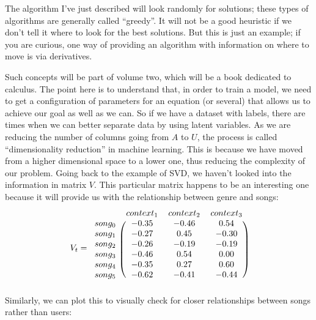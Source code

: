 \documentclass[600paper, 11pt,twoside,openany]{kdp}
\begin{document}
\par 
\vspace{-3pt}
\indent The algorithm I’ve just described will look randomly for solutions; these types of algorithms are generally called “greedy”. It will not be a good heuristic if we don’t tell it where to look for the best solutions. But this is just an example; if you are curious, one way of providing an algorithm with information on where to move is via derivatives. 
\par 
\vspace{-3pt}
\indent Such concepts will be part of volume two, which will be a book dedicated to calculus. The point here is to understand that, in order to train a model, we need to get a configuration of parameters for an equation (or several) that allows us to achieve our goal as well as we can. So if we have a dataset with labels, there are times when we can better separate data by using latent variables. As we are reducing the number of columns going from $A$ to $U$, the process is called “dimensionality reduction” in machine learning. This is because we have moved from a higher dimensional space to a lower one, thus reducing the complexity of our problem. Going back to the example of SVD, we haven’t looked into the information in matrix $V$. This particular matrix happens to be an interesting one because it will provide us with the relationship between genre and songs:
\[V_t = 
 \begin{blockarray}{ccccc}
& context_1 & context_2 & context_3\\
\begin{block}{c(cccc)}
song_0 & -0.35	& -0.46	& 0.54\\
song_1 & -0.27	& 0.45	& -0.30\\
song_2 & -0.26	& -0.19	& -0.19\\
song_3 & -0.46	& 0.54	& 0.00\\
song_4 & -0.35	& 0.27	& 0.60\\
song_5 & -0.62	& -0.41	& -0.44\\ 
\end{block}
\end{blockarray}
\]
\indent Similarly, we can plot this to visually check for closer relationships between songs rather than users:
\end{document}
